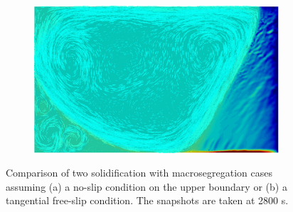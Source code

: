 \begin{figure}[htbp]
\begin{subfigure}[t]{0.15\textwidth}
  \end{subfigure}
  \begin{subfigure}[t]{0.4\textwidth}
    \centering
  \includegraphics[width=\textwidth]{Chapter5/Graphics/2d/ref_2800s_sliptop.png}
  \caption{}
    \label{fig:freeslip2800}
  \end{subfigure}
\caption{Comparison of two solidification with macrosegregation cases assuming (a) a no-slip condition on the upper boundary 
or (b) a tangential free-slip condition. The snapshots are taken at 2800 s.}
\label{fig:slipbc_2800}
\end{figure}

